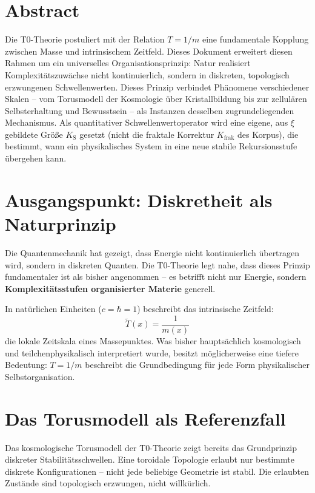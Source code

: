 
\section*{Abstract}	

		Die T0-Theorie postuliert mit der Relation $T = 1/m$ eine fundamentale Kopplung zwischen Masse und intrinsischem Zeitfeld. Dieses Dokument erweitert diesen Rahmen um ein universelles Organisationsprinzip: Natur realisiert Komplexitätszuwächse nicht kontinuierlich, sondern in diskreten, topologisch erzwungenen Schwellenwerten. Dieses Prinzip verbindet Phänomene verschiedener Skalen -- vom Torusmodell der Kosmologie über Kristallbildung bis zur zellulären Selbsterhaltung und Bewusstsein -- als Instanzen desselben zugrundeliegenden Mechanismus. Als quantitativer Schwellenwertoperator wird eine eigene, aus $\xi$ gebildete Größe $K_{\text{S}}$ gesetzt (nicht die fraktale Korrektur $K_{\text{frak}}$ des Korpus), die bestimmt, wann ein physikalisches System in eine neue stabile Rekursionsstufe übergehen kann.

	
	\section{Ausgangspunkt: Diskretheit als Naturprinzip}
	
	Die Quantenmechanik hat gezeigt, dass Energie nicht kontinuierlich übertragen wird, sondern in diskreten Quanten. Die T0-Theorie legt nahe, dass dieses Prinzip fundamentaler ist als bisher angenommen -- es betrifft nicht nur Energie, sondern \textbf{Komplexitätsstufen organisierter Materie} generell.
	
	In natürlichen Einheiten ($c = \hbar = 1$) beschreibt das intrinsische Zeitfeld:
	\begin{equation}
		\tilde{T}(x) = \frac{1}{m(x)}
	\end{equation}
	die lokale Zeitskala eines Massepunktes. Was bisher hauptsächlich kosmologisch und teilchenphysikalisch interpretiert wurde, besitzt möglicherweise eine tiefere Bedeutung: $T = 1/m$ beschreibt die Grundbedingung für jede Form physikalischer Selbstorganisation.
	
	\section{Das Torusmodell als Referenzfall}
	
	Das kosmologische Torusmodell der T0-Theorie zeigt bereits das Grundprinzip diskreter Stabilitätsschwellen. Eine toroidale Topologie erlaubt nur bestimmte diskrete Konfigurationen -- nicht jede beliebige Geometrie ist stabil. Die erlaubten Zustände sind topologisch erzwungen, nicht willkürlich.
	
